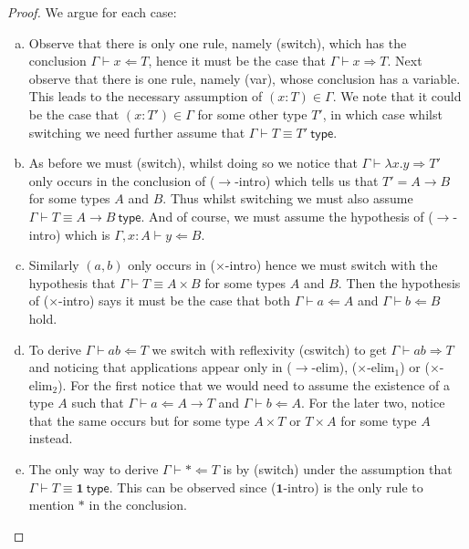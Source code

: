 \begin{proof}
    We argue for each case:
    \begin{enumerate}[(a)]
        \item Observe that there is only one rule, namely (switch), which has the conclusion $\Gamma \vdash x \Leftarrow T$, hence it must be the case that $\Gamma \vdash x \Rightarrow T$. Next observe that there is one rule, namely (var), whose conclusion has a variable. This leads to the necessary assumption of $(x : T) \in \Gamma$. We note that it could be the case that $(x : T') \in \Gamma$ for some other type $T'$, in which case whilst switching we need further assume that $\Gamma \vdash T \equiv T' \ \mathsf{type}$.
        
        \item As before we must (switch), whilst doing so we notice that $\Gamma \vdash \lambda x . y \Rightarrow T'$ only occurs in the conclusion of ($\to$-intro) which tells us that $T' = A \to B$ for some types $A$ and $B$. Thus whilst switching we must also assume $\Gamma \vdash T \equiv A \to B \ \mathsf{type}$. And of course, we must assume the hypothesis of ($\to$-intro) which is $\Gamma , x : A \vdash y \Leftarrow B$.
        
        \item Similarly $(a, b)$ only occurs in ($\times$-intro) hence we must switch with the hypothesis that $\Gamma \vdash T \equiv A \times B$ for some types $A$ and $B$. Then the hypothesis of ($\times$-intro) says it must be the case that both $\Gamma \vdash a \Leftarrow A$ and $\Gamma \vdash b \Leftarrow B$ hold.
        
        \item To derive $\Gamma \vdash a b \Leftarrow T$ we switch with reflexivity (cswitch) to get $\Gamma \vdash a b \Rightarrow T$ and noticing that applications appear only in ($\to$-elim), ($\times$-elim${}_1$) or ($\times$-elim${}_2$). For the first notice that we would need to assume the existence of a type $A$ such that $\Gamma \vdash a \Leftarrow A \to T$ and $\Gamma \vdash b \Leftarrow A$. For the later two, notice that the same occurs but for some type $A \times T$ or $T \times A$ for some type $A$ instead.
        
        \item The only way to derive $\Gamma \vdash * \Leftarrow T$ is by (switch) under the assumption that $\Gamma \vdash T \equiv \mathbf{1} \ \mathsf{type}$. This can be observed since ($\mathbf{1}$-intro) is the only rule to mention $*$ in the conclusion.
        

\end{enumerate}
\end{proof}
